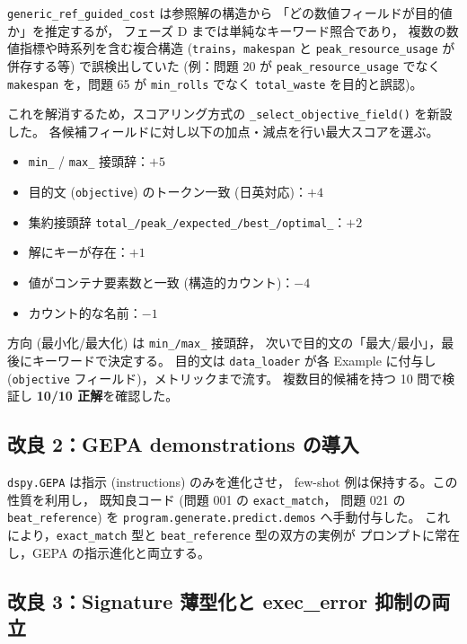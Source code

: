 \documentclass[uplatex,dvipdfmx,a4paper,11pt]{jsarticle}
\begin{document}
\texttt{generic\_ref\_guided\_cost} は参照解の構造から
「どの数値フィールドが目的値か」を推定するが，
フェーズ D までは単純なキーワード照合であり，
複数の数値指標や時系列を含む複合構造
(\texttt{trains}，\texttt{makespan} と \texttt{peak\_resource\_usage}
が併存する等) で誤検出していた
(例：問題 20 が \texttt{peak\_resource\_usage} でなく
\texttt{makespan} を，問題 65 が \texttt{min\_rolls} でなく
\texttt{total\_waste} を目的と誤認)。

これを解消するため，スコアリング方式の
\texttt{\_select\_objective\_field()} を新設した。
各候補フィールドに対し以下の加点・減点を行い最大スコアを選ぶ。

\begin{itemize}
  \item \texttt{min\_} / \texttt{max\_} 接頭辞：$+5$
  \item 目的文 (\texttt{objective}) のトークン一致 (日英対応)：$+4$
  \item 集約接頭辞 \texttt{total\_/peak\_/expected\_/best\_/optimal\_}：$+2$
  \item 解にキーが存在：$+1$
  \item 値がコンテナ要素数と一致 (構造的カウント)：$-4$
  \item カウント的な名前：$-1$
\end{itemize}

方向 (最小化/最大化) は \texttt{min\_/max\_} 接頭辞，
次いで目的文の「最大/最小」，最後にキーワードで決定する。
目的文は \texttt{data\_loader} が各 Example に付与し
(\texttt{objective} フィールド)，メトリックまで流す。
複数目的候補を持つ 10 問で検証し \textbf{10/10 正解}を確認した。

\subsection{改良 2：GEPA demonstrations の導入}

\texttt{dspy.GEPA} は指示 (instructions) のみを進化させ，
few-shot 例は保持する。この性質を利用し，
既知良コード (問題 001 の \texttt{exact\_match}，
問題 021 の \texttt{beat\_reference}) を
\texttt{program.generate.predict.demos} へ手動付与した。
これにより，\texttt{exact\_match} 型と
\texttt{beat\_reference} 型の双方の実例が
プロンプトに常在し，GEPA の指示進化と両立する。

\subsection{改良 3：Signature 薄型化と exec\_error 抑制の両立}
\end{document}
